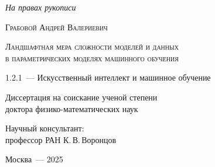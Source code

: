 \thispagestyle{empty}

\begin{titlepage}
\begin{center}
\end{center}
\vspace{1.5cm}
\begin{flushright}
\textit{На правах рукописи}
\end{flushright}
\vspace{1.5cm}
\begin{center}
\textsc{Грабовой Андрей Валериевич}
\par
\vspace{2cm}
\textsc{Ландшафтная мера сложности моделей и данных \\ в параметрических моделях машинного обучения}\\
\par
\vspace{2cm}
{1.2.1~--- Искусственный интеллект и машинное обучение}
\par
\vspace{2cm}
{Диссертация на соискание ученой степени\\
доктора физико-математических наук}
\end{center}
\vspace{2cm}
\hfill\parbox{8,4cm}{Научный консультант:
\\профессор РАН К.\,В.\,Воронцов}
\par
\vspace{3.5cm}
\begin{center}
{Москва~--- 2025}
\end{center}
\end{titlepage}